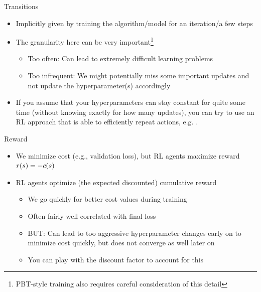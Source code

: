 \documentclass[main]{subfiles}
\begin{document}
\begin{frame}{Transitions}
    \begin{itemize}
        \item Implicitly given by training the algorithm/model for an iteration/a few steps\pause
        \item The granularity here can be very important\footnote{PBT-style training also requires careful consideration of this detail}
        \begin{itemize}\pause
            \item Too often: Can lead to extremely difficult learning problems
            \item Too infrequent: We might potentially miss some important updates and not update the hyperparameter(s) accordingly
        \end{itemize}\pause
        \item If you assume that your hyperparameters can stay constant for quite some time (without
knowing exactly for how many updates), you can try to use an RL approach that is able
to efficiently repeat actions, e.g. .
    \end{itemize}
\end{frame}
\begin{frame}{Reward}
    \begin{itemize}
        \item We minimize cost (e.g., validation loss), but RL agents maximize reward $r(s)=-c(s)$
        \item RL agents optimize (the expected discounted) cumulative reward
        \begin{itemize}
            \item We go quickly for better cost values during training
            \item Often fairly well correlated with final loss
            \item BUT: Can lead to too aggressive hyperparameter changes early on to minimize cost quickly, but does not converge as well later on
            \item You can play with the discount factor to account for this
        \end{itemize}
    \end{itemize}
\end{frame}
\end{document}
